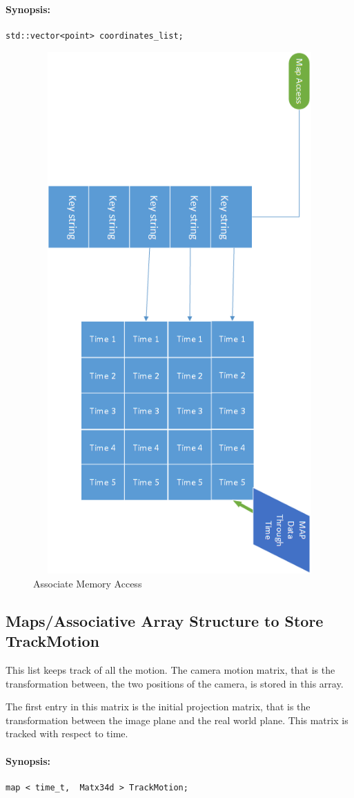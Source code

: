 \paragraph{Synopsis:}
\begin{lstlisting}
std::vector<point> coordinates_list;
\end{lstlisting}
\begin{figure}[ht]
    \centering
    \includegraphics[width=20cm,height=20cm,keepaspectratio]{Pictures/map_1.png}
    \caption{Associate Memory Access}
    \label{fig:map1}
\end{figure}

\subsection{Maps/Associative Array Structure to Store TrackMotion}
This list keeps track of all the motion. The camera motion matrix, that is the transformation between, the two positions of the camera, is stored in this array. 

The first entry in this matrix is the initial projection matrix, that is the transformation between the image plane and the real world plane. This matrix is tracked with respect to time.
\paragraph{Synopsis:}
\begin{lstlisting}
map < time_t,  Matx34d > TrackMotion; 
\end{lstlisting}

